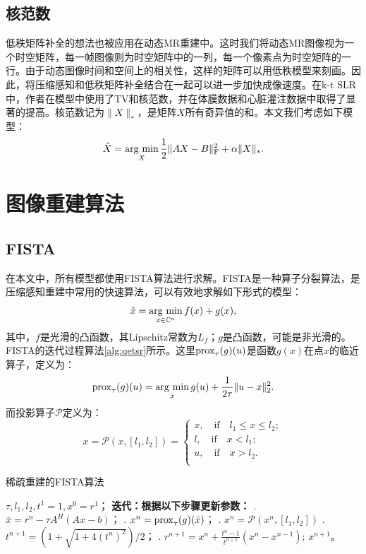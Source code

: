 \subsection{核范数}
低秩矩阵补全的想法也被应用在动态MR重建中。这时我们将动态MR图像视为一个时空矩阵，每一帧图像则为时空矩阵中的一列，每一个像素点为时空矩阵的一行。由于动态图像时间和空间上的相关性，这样的矩阵可以用低秩模型来刻画。因此，将压缩感知和低秩矩阵补全结合在一起可以进一步加快成像速度。在k-t SLR中，作者在模型中使用了TV和核范数，并在体膜数据和心脏灌注数据中取得了显著的提高。核范数记为$\|X\|_*$，是矩阵$X$所有奇异值的和。本文我们考虑如下模型：
\begin{equation}
\hat{X} = \argmin_X{\frac{1}{2}\|AX-B\|^2_\mathrm{F} + \alpha\|X\|_*}.
\end{equation}

\section{图像重建算法}
\subsection{FISTA}
在本文中，所有模型都使用FISTA\cite{fista}算法进行求解。FISTA是一种算子分裂算法，是压缩感知重建中常用的快速算法，可以有效地求解如下形式的模型：
\begin{equation}
\hat{x} = \argmin_{x \in \mathbb{\mathbb{C}}^n} f(x) + g(x),
\end{equation}
其中，$f$是光滑的凸函数，其Lipschitz常数为$L_f$；$g$是凸函数，可能是非光滑的。FISTA的迭代过程算法\ref{alg:qetsr}所示。这里$\mathrm{prox}_\tau(g)(u)$是函数$g(x)$在点$x$的临近算子，定义为：
\begin{equation}
\prox_\tau(g)(u)=\argmin_x{g(u)+\frac{1}{2\tau}}\|u-x\|_2^2.
\label{equ:prox}
\end{equation}
而投影算子$\mathscr{P}$定义为：
\begin{equation}
x=\mathscr{P}(x,[l_1,l_2]) =
\left\{
\begin{array}{ll}
x, \quad \mbox{if} \quad l_1\leq x\leq l_2; \\
l, \quad \mbox{if} \quad x<l_1;\\
u, \quad \mbox{if} \quad x>l_2.\\
\end{array}\right.
\end{equation}

\begin{algorithm}
	\caption{稀疏重建的FISTA算法}
	\label{alg:qetsr}
	\begin{algorithmic}
		\REQUIRE $\tau, l_1, l_2, t^1=1, x^0=r^1$；
		\INDSTATE[-1.25] \textbf{迭代：根据以下步骤更新参数：}	
		. $\bar{x}=r^n-\tau A^H(Ax-b)$；
		. $x^n=\mathrm{prox}_{\tau}(g)(\bar{x})$；
		. $x^n=\mathscr{P}(x^n,[l_1,l_2])$
		. $t^{n+1}=(1+\sqrt{1+4(t^n)^2})/2$；
		. $r^{n+1}=x^n+\frac{t^n-1}{t^{n+1}}(x^n-x^{n-1})$;
		\ENSURE $x^{n+1}$。
	\end{algorithmic}
\end{algorithm}


